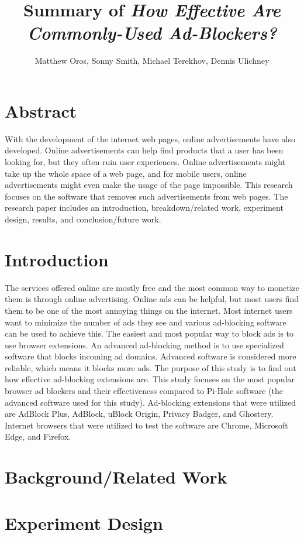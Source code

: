 \documentclass[sigsmall]{acmart}
\title{Summary of \emph{How Effective Are Commonly-Used Ad-Blockers?}}
\author{Matthew Oros, Sonny Smith, Michael Terekhov, Dennis Ulichney}
\begin{document}
\maketitle


\section*{Abstract}
With the development of the internet web pages, online advertisements have also developed. Online advertisements can help find products that a user has been looking for, but they often ruin user experiences. Online advertisements might take up the whole space of a web page, and for mobile users, online advertisements might even make the usage of the page impossible. This research focuses on the software that removes such advertisements from web pages. The research paper includes an introduction, breakdown/related work, experiment design, results, and conclusion/future work.  \cite{}

\section*{Introduction}
The services offered online are mostly free and the most common way to monetize them is through online advertising. Online ads can be helpful, but most users find them to be one of the most annoying things on the internet. Most internet users want to minimize the number of ads they see and various ad-blocking software can be used to achieve this. The easiest and most popular way to block ads is to use browser extensions. An advanced ad-blocking method is to use specialized software that blocks incoming ad domains. Advanced software is considered more reliable, which means it blocks more ads. The purpose of this study is to find out how effective ad-blocking extensions are. This study focuses on the most popular browser ad blockers and their effectiveness compared to Pi-Hole software (the advanced software used for this study). Ad-blocking extensions that were utilized are AdBlock Plus, AdBlock, uBlock Origin, Privacy Badger, and Ghostery. Internet browsers that were utilized to test the software are Chrome, Microsoft Edge, and Firefox.


\section*{Background/Related Work}


\section*{Experiment Design}
\end{document}
